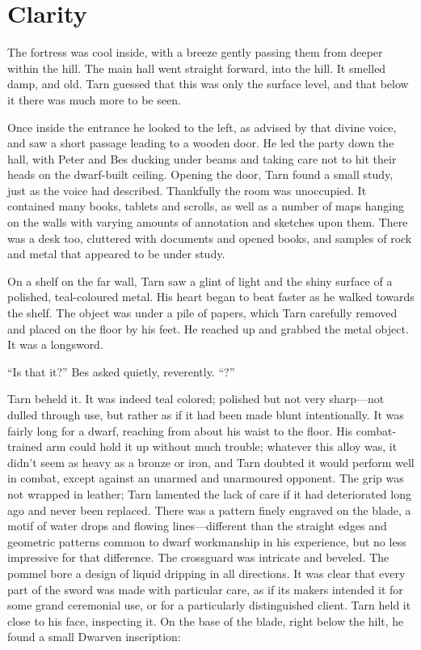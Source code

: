\chapter{Clarity}

The fortress was cool inside, with a breeze gently passing them from deeper within the hill.  The main hall went straight forward, into the hill.  It smelled damp, and old.  Tarn guessed that this was only the surface level, and that below it there was much more to be seen.

Once inside the entrance he looked to the left, as advised by that divine voice, and saw a short passage leading to a wooden door.  He led the party down the hall, with Peter and Bes ducking under beams and taking care not to hit their heads on the dwarf-built ceiling.  Opening the door, Tarn found a small study, just as the voice had described.  Thankfully the room was unoccupied.  It contained many books, tablets and scrolls, as well as a number of maps hanging on the walls with varying amounts of annotation and sketches upon them.  There was a desk too, cluttered with documents and opened books, and samples of rock and metal that appeared to be under study.

On a shelf on the far wall, Tarn saw a glint of light and the shiny surface of a polished, teal-coloured metal.  His heart began to beat faster as he walked towards the shelf.  The object was under a pile of papers, which Tarn carefully removed and placed on the floor by his feet.  He reached up and grabbed the metal object.  It was a longsword.

``Is that it?'' Bes asked quietly, reverently.  ``\kildir?''

Tarn beheld it.  It was indeed teal colored; polished but not very sharp---not dulled through use, but rather as if it had been made blunt intentionally.  It was fairly long for a dwarf, reaching from about his waist to the floor.  His combat-trained arm could hold it up without much trouble; whatever this alloy was, it didn't seem as heavy as a bronze or iron, and Tarn doubted it would perform well in combat, except against an unarmed and unarmoured opponent.  The grip was not wrapped in leather; Tarn lamented the lack of care if it had deteriorated long ago and never been replaced.  There was a pattern finely engraved on the blade, a motif of water drops and flowing lines---different than the straight edges and geometric patterns common to dwarf workmanship in his experience, but no less impressive for that difference.  The crossguard was intricate and beveled.  The pommel bore a design of liquid dripping in all directions.  It was clear that every part of the sword was made with particular care, as if its makers intended it for some grand ceremonial use, or for a particularly distinguished client.  Tarn held it close to his face, inspecting it.  On the base of the blade, right below the hilt, he found a small Dwarven inscription:

